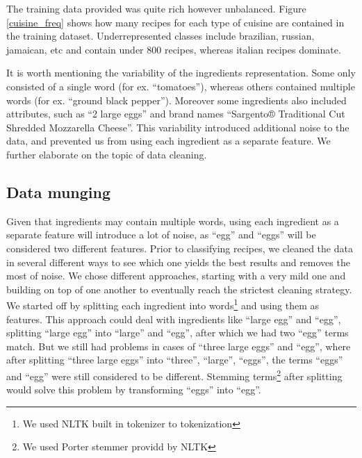 \documentclass[prodmode,acmtap]{acmlarge}
\begin{document}
The training data provided was quite rich however unbalanced. Figure \ref{cuisine_freq} shows how many recipes for each type of cuisine are contained in the training dataset. Underrepresented classes include brazilian, russian, jamaican, etc and contain under 800 recipes, whereas italian recipes dominate. 

It is worth mentioning the variability of the ingredients representation. Some only consisted of a single word (for ex. ``tomatoes''), whereas others contained multiple words (for ex. ``ground black pepper''). Moreover some ingredients also included attributes, such as ``2 large eggs'' and brand names ``Sargento® Traditional Cut Shredded Mozzarella Cheese''. This variability introduced additional noise to the data, and prevented us from using each ingredient as a separate feature. We further elaborate on the topic of data cleaning. 

\subsection{Data munging}
Given that ingredients may contain multiple words, using each ingredient as a separate feature will introduce a lot of noise, as “egg” and “eggs” will be considered two different features. Prior to classifying recipes, we cleaned the data in several different ways to see which one yields the best results and removes the most of noise. We chose different approaches, starting with a very mild one and building on top of one another to eventually reach the strictest cleaning strategy. 
We started off by splitting each ingredient into words\footnote{We used NLTK built in tokenizer to tokenization} and using them as features. This approach could deal with ingredients like ``large egg'' and ``egg'', splitting ``large egg'' into ``large'' and ``egg'', after which we had two ``egg'' terms match. 
But we still had problems in cases of ``three large eggs'' and ``egg'', where after splitting ``three large eggs'' into ``three'', ``large'', ``eggs'', the terms ``eggs'' and ``egg'' were still considered to be different. Stemming terms\footnote{We used Porter stemmer providd by NLTK} after splitting would solve this problem by transforming ``eggs'' into ``egg''. 
\end{document}
